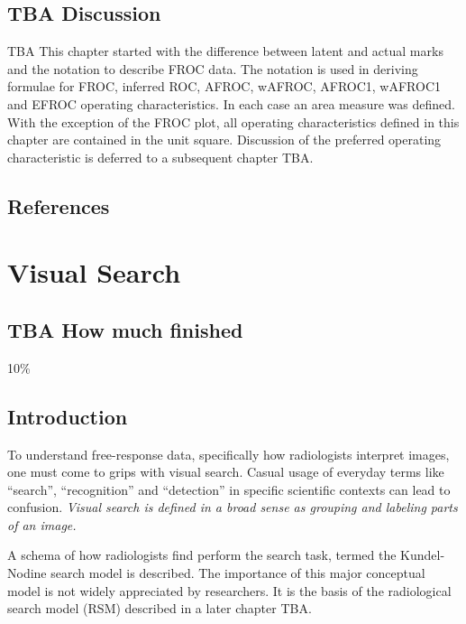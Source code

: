 \documentclass[
]{book}
\begin{document}
\hypertarget{froc-empirical-Discussion}{%
\section{TBA Discussion}\label{froc-empirical-Discussion}}

TBA This chapter started with the difference between latent and actual marks and the notation to describe FROC data. The notation is used in deriving formulae for FROC, inferred ROC, AFROC, wAFROC, AFROC1, wAFROC1 and EFROC operating characteristics. In each case an area measure was defined. With the exception of the FROC plot, all operating characteristics defined in this chapter are contained in the unit square. Discussion of the preferred operating characteristic is deferred to a subsequent chapter TBA.

\hypertarget{froc-empirical-references}{%
\section{References}\label{froc-empirical-references}}

\hypertarget{visual-search}{%
\chapter{Visual Search}\label{visual-search}}

\hypertarget{visual-search-how-much-finished}{%
\section{TBA How much finished}\label{visual-search-how-much-finished}}

10\%

\hypertarget{visual-search-intro}{%
\section{Introduction}\label{visual-search-intro}}

To understand free-response data, specifically how radiologists interpret images, one must come to grips with visual search. Casual usage of everyday terms like ``search'', ``recognition'' and ``detection'' in specific scientific contexts can lead to confusion.
\emph{Visual search is defined in a broad sense as grouping and labeling parts of an image.}

A schema of how radiologists find perform the search task, termed the Kundel-Nodine search model is described. The importance of this major conceptual model is not widely appreciated by researchers. It is the basis of the radiological search model (RSM) described in a later chapter TBA.
\end{document}
